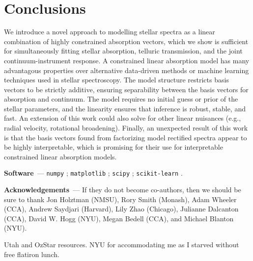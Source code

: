 \documentclass[modern]{aastex631}
\renewcommand{\paragraph}[1]{\medskip\par\noindent\textbf{#1}~---}
\newcommand{\todo}[1]{\textcolor{tab:red}{#1}}
\begin{document}
\section{Conclusions} \label{sec:conclusions}

We introduce a novel approach to modelling stellar spectra as a linear combination of highly constrained absorption vectors, which we show is sufficient for simultaneously fitting stellar absorption, telluric transmission, and the joint continuum-instrument response. A constrained linear absorption model has many advantagous properties over alternative data-driven methods or machine learning techniques used in stellar spectroscopy. The model structure restricts basis vectors to be strictly additive, ensuring separability between the basis vectors for absorption and continuum. The model requires no initial guess or prior of the stellar parameters, and the linearity ensures that inference is robust, stable, and fast. An extension of this work could also solve for other linear nuisances (e.g., radial velocity, rotational broadening). Finally, an unexpected result of this work is that the basis vectors found from factorizing model rectified spectra appear to be highly interpretable, which is promising for their use for interpretable constrained linear absorption models.\\





\paragraph{Software}
\texttt{numpy} \citep{numpy}; 
\texttt{matplotlib} \citep{matplotlib}; 
\texttt{scipy} \citep{scipy};
\texttt{scikit-learn} \citep{scikit_learn}.


\paragraph{Acknowledgements}
If they do not become co-authors, then we should be sure to thank
    Jon Holztman (NMSU),
    Rory Smith (Monash),
    Adam Wheeler (CCA),
    Andrew Saydjari (Harvard),
    Lily Zhao (Chicago),
    Julianne Dalcanton (CCA),
    David W. Hogg (NYU),
    Megan Bedell (CCA), and
    Michael Blanton (NYU).

\todo{Utah and OzStar resources. NYU for accommodating me as I starved without free flatiron lunch.}

%
\end{document}
